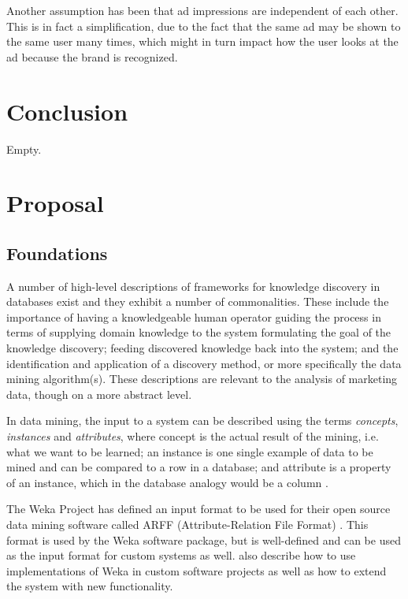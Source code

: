 \documentclass[10pt,twocolumn]{article}
\begin{document}
Another assumption has been that ad impressions are independent of each other. This is in fact a simplification, due to the fact that the same ad may be shown to the same user many times, which might in turn impact how the user looks at the ad because the brand is recognized.

\section{Conclusion}
Empty.

\section{Proposal}

\subsection{Foundations}
A number of high-level descriptions of frameworks for knowledge discovery in databases exist \citep{Fayyad1996, Frawley1992} and they exhibit a number of commonalities. These include the importance of having a knowledgeable human operator guiding the process in terms of supplying domain knowledge to the system formulating the goal of the knowledge discovery; feeding discovered knowledge back into the system; and the identification and application of a discovery method, or more specifically the data mining algorithm(s). These descriptions are relevant to the analysis of marketing data, though on a more abstract level.

In data mining, the input to a system can be described using the terms \emph{concepts}, \emph{instances} and \emph{attributes}, where concept is the actual result of the mining, i.e. what we want to be learned; an instance is one single example of data to be mined and can be compared to a row in a database; and attribute is a property of an instance, which in the database analogy would be a column \citep{Witten2011}.

The Weka Project has defined an input format to be used for their open source data mining software called ARFF (Attribute-Relation File Format) \citep{Garner1995, Witten2011}. This format is used by the Weka software package, but is well-defined and can be used as the input format for custom systems as well. \citet{Witten2011} also describe how to use implementations of Weka in custom software projects as well as how to extend the system with new functionality.
\end{document}
